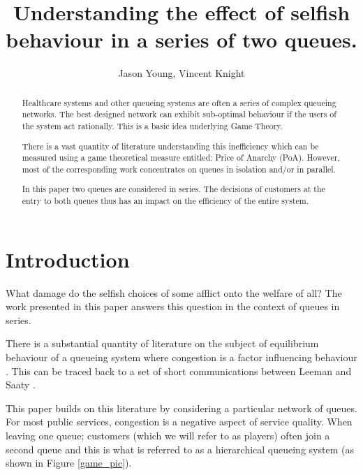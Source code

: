 \documentclass[12pt]{article}
\title{Understanding the effect of selfish behaviour in a series of two queues.}
\author{Jason Young, Vincent Knight}
\begin{document}
\maketitle

\begin{abstract}

Healthcare systems and other queueing systems are often a series of complex queueing networks.
The best designed network can exhibit sub-optimal behaviour if the users of the system act rationally.
This is a basic idea underlying Game Theory.


There is a vast quantity of literature understanding this inefficiency which can be measured using a game theoretical measure entitled: Price of Anarchy (PoA).
However, most of the corresponding work concentrates on queues in isolation and/or in parallel.

In this paper two queues are considered in series.
The decisions of customers at the entry to both queues thus has an impact on the efficiency of the entire system.

\end{abstract}


\section{Introduction}\label{Introduction}

What damage do the selfish choices of some afflict onto the welfare of all?
The work presented in this paper answers this question in the context of queues in series.

There is a substantial quantity of literature on the subject of equilibrium behaviour of a queueing system where congestion is a factor influencing behaviour \cite{bell1983individual,chr1972individual,  edelson1971congestion, luski1976partial, naor1969regulation, yechiali1972customers}.
This can be traced back to a set of short communications between Leeman \cite{leeman1964reduction, leeman1965letter} and Saaty \cite{saaty1965burdens}.

This paper builds on this literature by considering a particular network of queues.
For most public services, congestion is a negative aspect of service quality.
When leaving one queue; customers (which we will refer to as players) often join a second queue and this is what is referred to as a hierarchical queueing system (as shown in Figure \ref{game_pic}).
\end{document}
